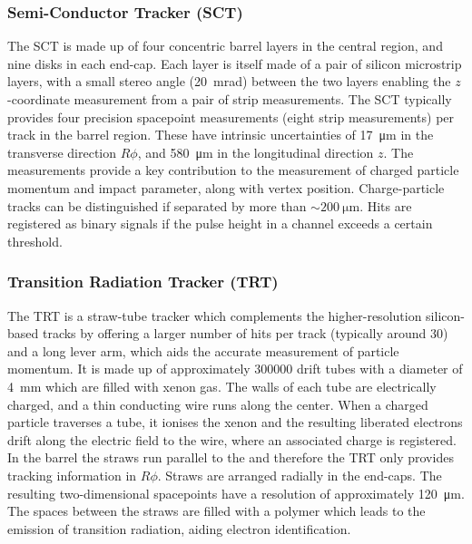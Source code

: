 \subsubsection{Semi-Conductor Tracker (SCT)}
The SCT is made up of four concentric barrel layers in the central region, and nine disks in each end-cap.
Each layer is itself made of a pair of silicon microstrip layers, with a small stereo angle (\SI{20}{\milli\radian}) between the two layers enabling the $z$\nobreakdash-coordinate measurement from a pair of strip measurements.
The SCT typically provides four precision spacepoint measurements (eight strip measurements) per track in the barrel region.
These have intrinsic uncertainties of \SI{17}{\micro\meter} in the transverse direction $R\phi$, and \SI{580}{\micro\meter} in the longitudinal direction $z$.
The measurements provide a key contribution to the measurement of charged particle momentum and impact parameter, along with vertex position.
Charge-particle tracks can be distinguished if separated by more than $\sim \SI{200}{\micro\meter}$.
Hits are registered as binary signals if the pulse height in a channel exceeds a certain threshold.


\subsubsection{Transition Radiation Tracker (TRT)}
The TRT is a straw-tube tracker which complements the higher-resolution silicon-based tracks by offering a larger number of hits per track (typically around 30) and a long lever arm, which aids the accurate measurement of particle momentum. 
It is made up of approximately \num{300000} drift tubes with a diameter of \SI{4}{\milli\meter} which are filled with xenon gas.
The walls of each tube are electrically charged, and a thin conducting wire runs along the center.
When a charged particle traverses a tube, it ionises the xenon and the resulting liberated electrons drift along the electric field to the wire, where an associated charge is registered.
In the barrel the straws run parallel to the  and therefore the TRT only provides tracking information in $R\phi$. Straws are arranged radially in the end-caps. The resulting two-dimensional spacepoints have a resolution of approximately \SI{120}{\micro\meter}.
The spaces between the straws are filled with a polymer which leads to the emission of transition radiation, aiding electron identification.

